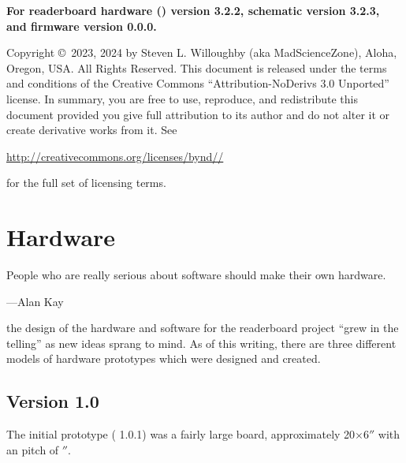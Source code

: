 \strut\vfill

\begin{center}\bfseries
	For readerboard hardware () version 3.2.2, schematic version 3.2.3, and firmware version 0.0.0.
\end{center}

\strut\vfill

\noindent Copyright \copyright\ 2023, 2024 by Steven L. Willoughby
(aka MadScienceZone), Aloha, Oregon, USA. All Rights Reserved.
This document is released under the terms and conditions of the
Creative Commons ``Attribution-NoDerivs 3.0 Unported'' license.
In summary, you are free to use, reproduce, and redistribute this 
document provided you give full attribution to its author and do not
alter it or create derivative works from it.  See
\begin{center}
\href{http://creativecommons.org/licenses/by-nd-3.0}{http://creativecommons.org/licenses/by\-nd\-//} 
\end{center}
for the full set of licensing terms.

\begin{center}
\end{center}

\newpage
\tableofcontents
\newpage
\listoffigures
\listoftables
\mainmatter

%
\chapter{Hardware}
\epigraph{People who are really serious about software should make their own hardware.}{---Alan Kay}
 the design of the hardware and software for the readerboard
project ``grew in the telling'' as new ideas sprang to mind. As of this writing, there are three
different models of hardware prototypes which were designed and created.

\section{Version 1.0}
The initial prototype ( 1.0.1) was a fairly large board, approximately 20$\times$6$''$
with an  pitch of $''$.

